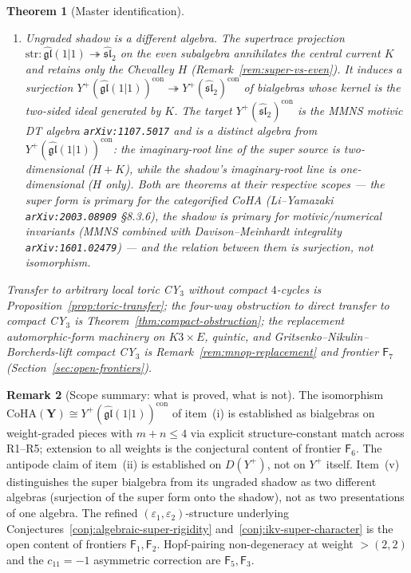 \documentclass[11pt]{amsart}
\newtheorem{theorem}{Theorem}[section]
\theoremstyle{definition}
\newtheorem{remark}[theorem]{Remark}
\providecommand{\CoHA}{\mathrm{CoHA}}
\providecommand{\bY}{\mathbf{Y}}
\providecommand{\fgl}{\mathfrak{gl}}
\providecommand{\fsl}{\mathfrak{sl}}
\begin{document}
\begin{theorem}[Master identification]
\begin{enumerate}[label=\emph{(\roman*)}, leftmargin=2em]
  across chambers, not merely projectively equivariant
  (Theorems~\ref{thm:chambers},~\ref{thm:chamber-inv-pairing}).
\item \emph{Ungraded shadow is a different algebra.} The
  supertrace projection $\mathrm{str}\colon\widehat{\fgl}(1|1)
  \twoheadrightarrow\widehat{\fsl}_{2}$ on the even subalgebra
  annihilates the central current $K$ and retains only the Chevalley
  $H$ (Remark~\ref{rem:super-vs-even}). It induces a surjection
  $Y^{+}(\widehat{\fgl}(1|1))^{\mathrm{con}}
   \twoheadrightarrow Y^{+}(\widehat{\fsl}_{2})^{\mathrm{con}}$
  of bialgebras whose kernel is the two-sided ideal generated by
  $K$. The target $Y^{+}(\widehat{\fsl}_{2})^{\mathrm{con}}$ is the
  MMNS motivic DT algebra \texttt{arXiv:1107.5017} and is a
  \emph{distinct algebra} from $Y^{+}(\widehat{\fgl}(1|1))^{\mathrm{con}}$:
  the imaginary-root line of the super source is two-dimensional
  ($H + K$), while the shadow's imaginary-root line is one-dimensional
  ($H$ only). Both are theorems at their respective scopes --- the super
  form is primary for the categorified CoHA (Li--Yamazaki
  \texttt{arXiv:2003.08909} §8.3.6), the shadow is primary for
  motivic/numerical invariants (MMNS combined with Davison--Meinhardt
  integrality \texttt{arXiv:1601.02479}) --- and the relation between
  them is surjection, not isomorphism.
\end{enumerate}
Transfer to arbitrary local toric CY$_{3}$ without compact $4$-cycles
is Proposition~\ref{prop:toric-transfer}; the four-way obstruction to
direct transfer to compact CY$_{3}$ is
Theorem~\ref{thm:compact-obstruction}; the replacement
automorphic-form machinery on $K3\times E$, quintic, and
Gritsenko--Nikulin--Borcherds-lift compact CY$_{3}$ is
Remark~\ref{rem:mnop-replacement} and frontier
$\mathsf F_{7}$ (Section~\ref{sec:open-frontiers}).
\end{theorem}

\begin{remark}[Scope summary: what is proved, what is not]
\label{rem:master-theorem-scope}
The isomorphism $\CoHA(\bY) \cong
Y^{+}(\widehat{\fgl}(1|1))^{\mathrm{con}}$ of item~(i) is established
as bialgebras on weight-graded pieces with $m+n\leq 4$ via explicit
structure-constant match across R1--R5; extension to all weights is
the conjectural content of frontier $\mathsf F_{6}$. The antipode
claim of item~(ii) is established on $D(Y^{+})$, not on $Y^{+}$
itself. Item~(v) distinguishes the super
bialgebra from its ungraded shadow as two different algebras
(surjection of the super form onto the shadow), not as two
presentations of one algebra. The refined
$(\varepsilon_{1},\varepsilon_{2})$-structure underlying
Conjectures~\ref{conj:algebraic-super-rigidity}
and~\ref{conj:ikv-super-character} is the open content of frontiers
$\mathsf F_{1}, \mathsf F_{2}$. Hopf-pairing non-degeneracy at weight
$>(2,2)$ and the $c_{11} = -1$ asymmetric correction are
$\mathsf F_{5}, \mathsf F_{3}$.
\end{remark}
\end{document}
